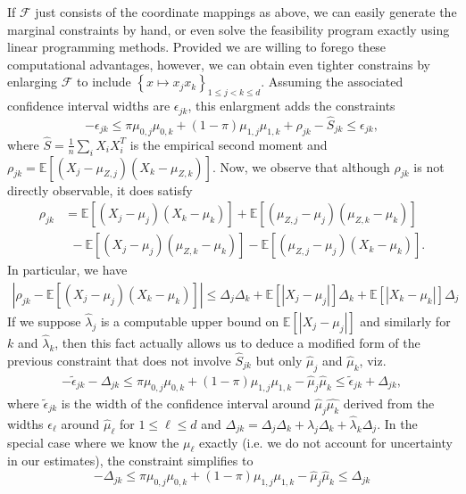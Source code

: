 \documentclass[11pt,twoside]{article}
\newcommand{\E}{\mathbb{E}}
\newcommand{\funcs}{\mathcal{F}}
\begin{document}
If $\funcs$ just consists of the coordinate mappings as above, we can easily generate the marginal constraints by hand, or even solve the feasibility program exactly using linear programming methods. Provided we are willing to forego these computational advantages, however, we can obtain even tighter constrains by enlarging $\funcs$ to include $\left\lbrace x \mapsto x_{j}x_{k}\right\rbrace_{1 \leq j < k \leq d}$. Assuming the associated confidence interval widths are $\epsilon_{jk}$, this enlargment adds the constraints
\begin{equation}
-\epsilon_{jk} \leq \pi\mu_{0,j}\mu_{0,k} + (1 - \pi)\mu_{1,j}\mu_{1,k} + \rho_{jk} - \hat{S}_{jk} \leq \epsilon_{jk},
\end{equation}
where $\hat{S} = \frac{1}{n}\sum_{i} X_{i}X_{i}^{T}$ is the empirical second moment and $\rho_{jk} = \E\left[\left(X_{j} - \mu_{Z,j}\right)\left(X_{k} - \mu_{Z,k}\right)\right]$. Now, we observe that although $\rho_{jk}$ is not directly observable, it does satisfy
\begin{align*}
\rho_{jk} & = \E\left[\left(X_{j} - \mu_{j}\right)\left(X_{k} - \mu_{k}\right)\right] + \E\left[\left(\mu_{Z,j} - \mu_{j}\right)\left(\mu_{Z,k} -\mu_{k}\right)\right] \\
 &~~ - \E\left[\left(X_{j} - \mu_{j}\right)\left(\mu_{Z,k} - \mu_{k}\right)\right] - \E\left[\left(\mu_{Z,j} - \mu_{j}\right)\left(X_{k} - \mu_{k}\right)\right] .
\end{align*}
In particular, we have
\begin{align*}
\left|\rho_{jk} - \E\left[\left(X_{j} - \mu_{j}\right)\left(X_{k} - \mu_{k}\right)\right]\right| \leq \Delta_{j}\Delta_{k} + \E\left[\left|X_{j} - \mu_{j}\right|\right]\Delta_{k} + \E\left[\left|X_{k} - \mu_{k}\right|\right]\Delta_{j} 
\end{align*}
If we suppose $\hat{\lambda}_{j}$ is a computable upper bound on $\E\left[\left|X_{j} - \mu_{j}\right|\right]$ and similarly for $k$ and $\hat{\lambda}_{k}$, then this fact actually allows us to deduce a modified form of the previous constraint that does not involve $\hat{S}_{jk}$ but only $\hat{\mu}_{j}$ and $\hat{\mu}_{k}$, viz.
\begin{align}
-\tilde{\epsilon}_{jk} - \Delta_{jk} \leq  \pi\mu_{0,j}\mu_{0,k} + (1 - \pi)\mu_{1,j}\mu_{1,k} - \hat{\mu}_{j}\hat{\mu}_{k} \leq \tilde{\epsilon}_{jk} + \Delta_{jk},
\end{align}
where $\tilde{\epsilon}_{jk}$ is the width of the confidence interval around $\hat{\mu}_{j}\hat{\mu_{k}}$ derived from the widths $\epsilon_{\ell}$ around $\hat{\mu}_{\ell}$ for $1 \leq \ell \leq d$ and $\Delta_{jk} = \Delta_{j}\Delta_{k} + \hat{\lambda}_{j}\Delta_{k} + \hat{\lambda}_{k}\Delta_{j}$.  In the special case where we know the $\mu_{\ell}$ exactly (i.e. we do not account for uncertainty in our estimates), the constraint simplifies to
\begin{equation}
- \Delta_{jk} \leq  \pi\mu_{0,j}\mu_{0,k} + (1 - \pi)\mu_{1,j}\mu_{1,k} - \hat{\mu}_{j}\hat{\mu}_{k} \leq \Delta_{jk}
\end{equation}
\end{document}
